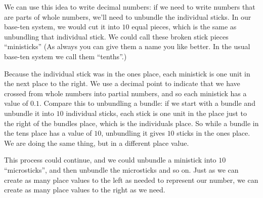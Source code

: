 \documentclass{ximera}
\begin{document}
We can use this idea to write decimal numbers: if we need to write numbers that are parts of whole numbers, we'll need to unbundle the individual sticks. In our base-ten system, we would cut it into $10$ equal pieces, which is the same as unbundling that individual stick. We could call these broken stick pieces ``ministicks'' (As always you can give them a name you like better. In the usual base-ten system we call them ``tenths''.)

\begin{image}
\end{image}

Because the individual stick was in the ones place, each ministick is one unit in the next place to the right. We use a decimal point to indicate that we have crossed from whole numbers into partial numbers, and so each ministick has a value of $0.1$. Compare this to unbundling a bundle: if we start with a bundle and unbundle it into $10$ individual sticks, each stick is one unit in the place just to the right of the bundles place, which is the individuals place. So while a bundle in the tens place has a value of $10$, unbundling it gives $10$ sticks in the ones place. We are doing the same thing, but in a different place value.

This process could continue, and we could unbundle a ministick into $10$ ``microsticks'', and then unbundle the microsticks and so on. Just as we can create as many place values to the left as needed to represent our number, we can create as many place values to the right as we need.
\end{document}
